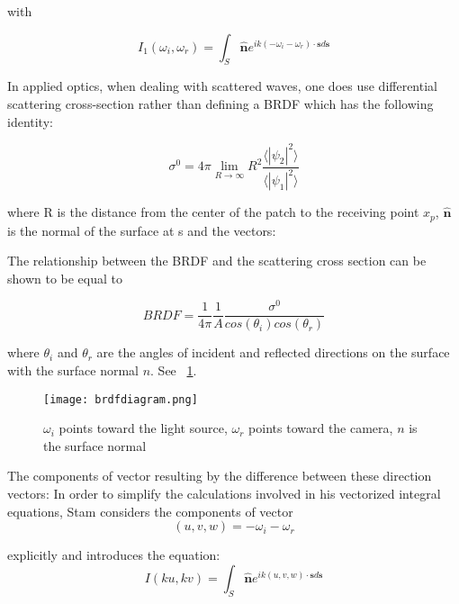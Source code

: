 with

\begin{equation}
I_{1}(\omega_i, \omega_r) = \int_{S} \hat{\mathbf{n}} e^{ik(-\omega_i-\omega_{r}) \cdot \mathbf{s} d\mathbf{s}}
\label{eq:IBase}
\end{equation}

In applied optics, when dealing with scattered waves, one does use differential scattering cross-section rather than defining a BRDF which has the following identity: 

\begin{equation}
    \sigma^0 = 4 \pi \lim_{R \to \infty} R^2 \frac{\langle \left|\psi_2\right|^2\rangle}{\langle \left|\psi_1\right|^2\rangle}
\end{equation}

where R is the distance from the center of the patch to the receiving point $x_p$, $\hat{\mathbf{n}}$ is the normal of the surface at s and the vectors:

The relationship between the BRDF and the scattering cross section can be shown to be equal to 

\begin{equation}
 BRDF = \frac{1}{4\pi}\frac{1}{A}\frac{\sigma^0}{cos(\theta_i)cos(\theta_r)}
 \label{fig:crossscateringbrdfrelationship} 
\end{equation}

where $\theta_i$ and $\theta_r$ are the angles of incident and reflected directions on the surface with the surface normal $n$. See ~\ref{fig:geometricsetup}.

\begin{figure}[ht]
  \centering
  \texttt{[image: brdfdiagram.png]}
  \caption{$\omega_i$ points toward the light source, $\omega_r$ points toward the camera, $n$ is the surface normal}
  \label{fig:geometricsetup}  
\end{figure}

The components of vector resulting by the difference between these direction vectors:
In order to simplify the calculations involved in his vectorized integral equations, Stam considers the components of vector 
\begin{equation}
  (u,v,w) = -\omega_i - \omega_r 
\label{eq:uvw}
\end{equation}

explicitly and introduces the equation: 
\begin{equation}
  I(ku,kv) = \int_{S} \hat{\mathbf{n}} e^{ik(u,v,w) \cdot \mathbf{s} d\mathbf{s}} 
\label{eq:Istart}
\end{equation}

